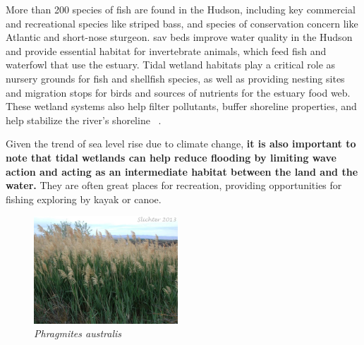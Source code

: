 \begin{displayquote}
More than 200 species of fish are found in the Hudson, including key commercial
    and recreational species like striped bass, and species of conservation
    concern like Atlantic and short-nose sturgeon. \gls{sav} beds improve water
    quality in the Hudson and provide essential habitat for invertebrate
    animals, which feed fish and waterfowl that use the estuary. Tidal wetland
    habitats play a critical role as nursery grounds for fish and shellfish
    species, as well as providing nesting sites and migration stops for birds
    and sources of nutrients for the estuary food web. These wetland systems
    also help filter pollutants, buffer shoreline properties, and help
    stabilize the river’s shoreline ~\cite{haeckel2014}.
\end{displayquote}

Given the trend of sea level rise due to climate change, \textbf{it is also
important to note that tidal wetlands can help reduce flooding by limiting wave
action and acting as an intermediate habitat between the land and the water.}
They are often great places for recreation, providing opportunities for fishing
exploring by kayak or canoe. 
\begin{figure}
    \includegraphics[width=0.48\textwidth]{images/Common_reed.jpg}
  \caption{\textit{Phragmites australis}}
\end{figure}

